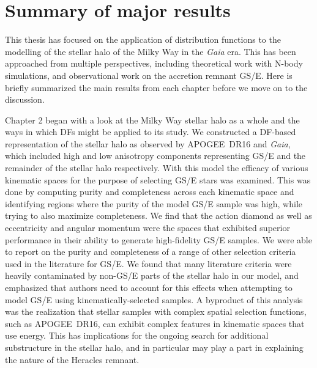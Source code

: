 \section{Summary of major results}

This thesis has focused on the application of distribution functions to the modelling of the stellar halo of the Milky Way in the \textit{Gaia} era. This has been approached from multiple perspectives, including theoretical work with N-body simulations, and observational work on the accretion remnant GS/E. Here is briefly summarized the main results from each chapter before we move on to the discussion.

Chapter 2 began with a look at the Milky Way stellar halo as a whole and the ways in which DFs might be applied to its study. We constructed a DF-based representation of the stellar halo as observed by APOGEE~DR16 and \textit{Gaia}, which included high and low anisotropy components representing GS/E and the remainder of the stellar halo respectively. With this model the efficacy of various kinematic spaces for the purpose of selecting GS/E stars was examined. This was done by computing purity and completeness across each kinematic space and identifying regions where the purity of the model GS/E sample was high, while trying to also maximize completeness. We find that the action diamond as well as eccentricity and angular momentum were the spaces that exhibited superior performance in their ability to generate high-fidelity GS/E samples. We were able to report on the purity and completeness of a range of other selection criteria used in the literature for GS/E. We found that many literature criteria were heavily contaminated by non-GS/E parts of the stellar halo in our model, and emphasized that authors need to account for this effects when attempting to model GS/E using kinematically-selected samples. A byproduct of this analysis was the realization that stellar samples with complex spatial selection functions, such as APOGEE~DR16, can exhibit complex features in kinematic spaces that use energy. This has implications for the ongoing search for additional substructure in the stellar halo, and in particular may play a part in explaining the nature of the Heracles remnant. 

